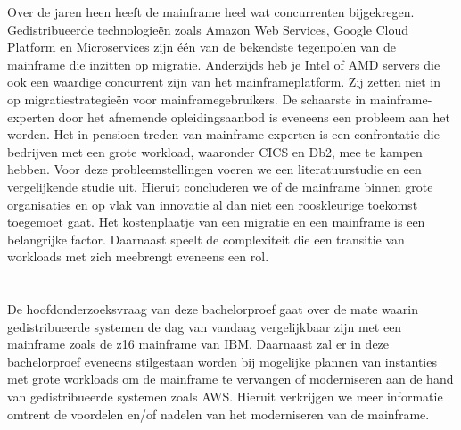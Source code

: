 Over de jaren heen heeft de mainframe heel wat concurrenten bijgekregen. Gedistribueerde technologieën zoals Amazon Web Services, Google Cloud Platform en Microservices zijn één van de bekendste tegenpolen van de mainframe die inzitten op migratie. Anderzijds heb je Intel of AMD servers die ook een waardige concurrent zijn van het mainframeplatform. Zij zetten niet in op migratiestrategieën voor mainframegebruikers. De schaarste in mainframe-experten door het afnemende opleidingsaanbod is eveneens een probleem aan het worden. Het in pensioen treden van mainframe-experten is een confrontatie die bedrijven met een grote workload, waaronder CICS en Db2, mee te kampen hebben. Voor deze probleemstellingen voeren we een literatuurstudie en een vergelijkende studie uit. Hieruit concluderen we of de mainframe binnen grote organisaties en op vlak van innovatie al dan niet een rooskleurige toekomst toegemoet gaat. Het kostenplaatje van een migratie en een mainframe is een belangrijke factor. Daarnaast speelt de complexiteit die een transitie van workloads met zich meebrengt eveneens een rol. 

\section{}
\label{sec:onderzoeksvraag}

De hoofdonderzoeksvraag van deze bachelorproef gaat over de mate waarin gedistribueerde systemen de dag van vandaag vergelijkbaar zijn met een mainframe zoals de z16 mainframe van IBM. Daarnaast zal er in deze bachelorproef eveneens stilgestaan worden bij mogelijke plannen van instanties met grote workloads om de mainframe te vervangen of moderniseren aan de hand van gedistribueerde systemen zoals AWS. Hieruit verkrijgen we meer informatie omtrent de voordelen en/of nadelen van het moderniseren van de mainframe. 

\section{}
\label{sec:onderzoeksdoelstelling}

\subsection{}

